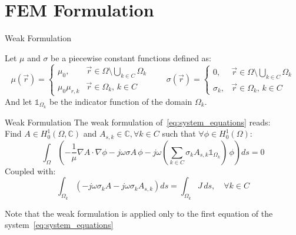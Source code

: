 \documentclass[aspectratio=54,xcolor=dvipsnames]{beamer}
\begin{document}
\section{FEM Formulation}
\begin{frame}{Weak Formulation}
    \begin{footnotesize}
    Let $\mu$ and $\sigma$ be a piecewise constant functions defined as:
    \[
    \mu(\vec{r}) = 
    \begin{cases}
        \mu_0, & \vec{r} \in \Omega \setminus \bigcup_{k \in C} \Omega_k \\
        \mu_0\mu_{r,k} & \vec{r} \in \Omega_k, \, k \in C
    \end{cases}
    \qquad
    \sigma(\vec{r}) = 
    \begin{cases}
        0, & \vec{r} \in \Omega \setminus \bigcup_{k \in C} \Omega_k \\
        \sigma_k, & \vec{r} \in \Omega_k, \, k \in C
    \end{cases}
    \]
    And let $\mathds{1}_{\Omega_k}$ be the indicator function of the domain $\Omega_k$. \\
    \begin{block}{Weak Formulation}
    The weak formulation of~\eqref{eq:system_equations} reads: \\
    Find $A \in H^1_0(\Omega, \mathbb{C})$ and $A_{s,k} \in \mathbb{C}, \forall k \in C$ such that $\forall \phi \in H^1_0(\Omega)$:
    \begin{equation} 
        \int_{\Omega} \left( -\frac{1}{\mu} \nabla A \cdot \nabla \phi - j\omega \sigma A \, \phi - j\omega \left(\sum_{k \in C} \sigma_k A_{s,k} \mathds{1}_{\Omega_k} \right) \, \phi \right) ds = 0
        \label{eq:weak_formulation}
    \end{equation}
    Coupled with:
    \begin{equation}
        \int_{\Omega_k} \left(- j\omega \sigma_k A - j\omega \sigma_k A_{s,k} \right) ds = \int_{\Omega_k} J \, ds, \quad \forall k \in C
        \label{eq:current_constraint_weak}
    \end{equation}
    \end{block}
    Note that the weak formulation is applied only to the first equation of the system~\eqref{eq:system_equations}
    \end{footnotesize}
\end{frame}
\end{document}
